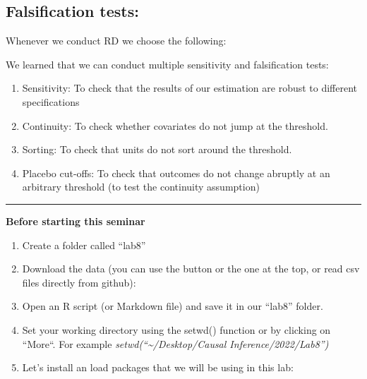 \documentclass[
  letterpaper,
  DIV=11,
  numbers=noendperiod]{scrreprt}
\providecommand{\tightlist}{%
  \setlength{\itemsep}{0pt}\setlength{\parskip}{0pt}}\usepackage{longtable,booktabs,array}
\begin{document}
\hypertarget{falsification-tests}{%
\subsection{Falsification tests:}\label{falsification-tests}}

Whenever we conduct RD we choose the following:

We learned that we can conduct multiple sensitivity and falsification
tests:

\begin{enumerate}
\def\labelenumi{\arabic{enumi}.}
\tightlist
\item
  Sensitivity: To check that the results of our estimation are robust to
  different specifications
\item
  Continuity: To check whether covariates do not jump at the threshold.
\item
  Sorting: To check that units do not sort around the threshold.
\item
  Placebo cut-offs: To check that outcomes do not change abruptly at an
  arbitrary threshold (to test the continuity assumption)
\end{enumerate}

\begin{center}\rule{0.5\linewidth}{0.5pt}\end{center}

\textbf{Before starting this seminar}

\begin{enumerate}
\def\labelenumi{\arabic{enumi}.}
\item
  Create a folder called ``lab8''
\item
  Download the data (you can use the button or the one at the top, or
  read csv files directly from github):
\item
  Open an R script (or Markdown file) and save it in our ``lab8''
  folder.
\item
  Set your working directory using the setwd() function or by clicking
  on ``More``. For example \emph{setwd(``\textasciitilde/Desktop/Causal
  Inference/2022/Lab8'')}
\item
  Let's install an load packages that we will be using in this lab:
\end{enumerate}
\end{document}
